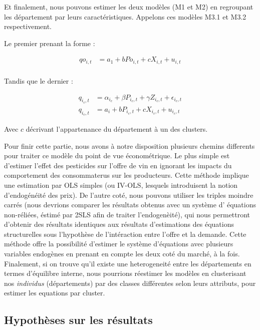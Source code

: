 \documentclass[11pt,]{article}
\begin{document}
Et finalement, nous pouvons estimer les deux modèles (M1 et M2) en
regroupant les département par leurs caractéristiques. Appelons ces
modèles M3.1 et M3.2 respectivement.

Le premier prenant la forme :

\begin{align*}
  qo_{i,t} & = a_1 + b Po_{i,t} + c X_{i,t} + u_{i,t} \\ 
\end{align*}

Tandis que le dernier :

\begin{align*}
  q_{i_{c},t} & = \alpha_{i_{c}} + \beta P_{i_{c},t} + \gamma Z_{i_{c},t} + \epsilon_{i_{c},t} \\
  q_{i_{c},t} & = a_i + b P_{i_{c},t} + c X_{i_{c},t} + u_{i_{c},t}
\end{align*}

Avec \(c\) décrivant l'appartenance du département à un des clusters.

Pour finir cette partie, nous avons à notre disposition plusieurs
chemins differents pour traiter ce modèle du point de vue économétrique.
Le plus simple est d'estimer l'effet des pesticides sur l'offre de vin
en ignorant les impacts du comportement des consommaterus sur les
producteurs. Cette méthode implique une estimation par OLS simples (ou
IV-OLS, lesquels introduisent la notion d'endogénéité des prix). De
l'autre coté, nous pouvons utiliser les triples moindre carrés (nous
devrions comparer les résultats obtenus avec un système d' équations
non-réliées, éstimé par 2SLS afin de traiter l'endogenèité), qui nous
permettront d'obtenir des résultats identiques aux résultats
d'estimations des équations structurelles sous l'hypothèse de
l'intéraction entre l'offre et la demande. Cette méthode offre la
possibilité d'estimer le système d'équations avec plusieurs variables
endogènes en prenant en compte les deux coté du marché, à la fois.
Finalement, si on trouve qu'il existe une heterogeneité entre les
départements en termes d'équilibre interne, nous pourrions réestimer les
modèles en clusterisant nos \emph{individus} (départements) par des
classes différentes selon leurs attributs, pour estimer les equations
par cluster.

\hypertarget{hypotheses-sur-les-resultats}{%
\subsection{Hypothèses sur les
résultats}\label{hypotheses-sur-les-resultats}}
\end{document}
